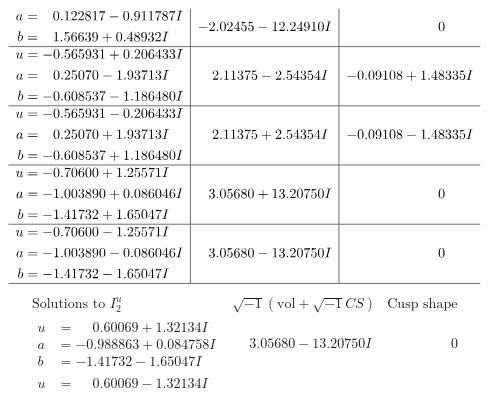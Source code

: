 \documentclass[1p]{elsarticle_modified}
\theoremstyle{definition}
\newcommand{\I}{\sqrt{-1}}
\begin{document}
$$\begin{array}{c|c|c}
\begin{aligned}
a &= \phantom{-}0.122817 - 0.911787 I \\
b &= \phantom{-}1.56639 + 0.48932 I\end{aligned}
 & -2.02455 - 12.24910 I & \phantom{-0.000000 } 0 \\ \hline\begin{aligned}
u &= -0.565931 + 0.206433 I \\
a &= \phantom{-}0.25070 - 1.93713 I \\
b &= -0.608537 - 1.186480 I\end{aligned}
 & \phantom{-}2.11375 - 2.54354 I & -0.09108 + 1.48335 I \\ \hline\begin{aligned}
u &= -0.565931 - 0.206433 I \\
a &= \phantom{-}0.25070 + 1.93713 I \\
b &= -0.608537 + 1.186480 I\end{aligned}
 & \phantom{-}2.11375 + 2.54354 I & -0.09108 - 1.48335 I \\ \hline\begin{aligned}
u &= -0.70600 + 1.25571 I \\
a &= -1.003890 + 0.086046 I \\
b &= -1.41732 + 1.65047 I\end{aligned}
 & \phantom{-}3.05680 + 13.20750 I & \phantom{-0.000000 } 0 \\ \hline\begin{aligned}
u &= -0.70600 - 1.25571 I \\
a &= -1.003890 - 0.086046 I \\
b &= -1.41732 - 1.65047 I\end{aligned}
 & \phantom{-}3.05680 - 13.20750 I & \phantom{-0.000000 } 0\\
 \hline 
 \end{array}$$\newpage$$\begin{array}{c|c|c}  
\text{Solutions to }I^u_{2}& \I (\text{vol} + \sqrt{-1}CS) & \text{Cusp shape}\\
 \hline 
\begin{aligned}
u &= \phantom{-}0.60069 + 1.32134 I \\
a &= -0.988863 + 0.084758 I \\
b &= -1.41732 - 1.65047 I\end{aligned}
 & \phantom{-}3.05680 - 13.20750 I & \phantom{-0.000000 } 0 \\ \hline\begin{aligned}
u &= \phantom{-}0.60069 - 1.32134 I \\

\end{aligned}
\end{array}$$
\end{document}
